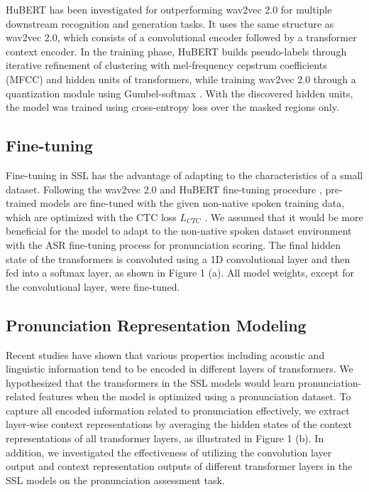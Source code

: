 \documentclass[a4paper]{article}
\begin{document}
HuBERT \cite{hsu2021hubert} has been investigated for outperforming wav2vec 2.0 for multiple downstream recognition and generation tasks. It uses the same structure as wav2vec 2.0, which consists of a convolutional encoder followed by a transformer context encoder. In the training phase, HuBERT builds pseudo-labels through iterative refinement of clustering with mel-frequency cepstrum coefficients (MFCC) and hidden units of transformers, while training wav2vec 2.0 through a quantization module using Gumbel-softmax \cite{baevski2020wav2vec}. With the discovered hidden units, the model was trained using cross-entropy loss over the masked regions only.



\subsection{Fine-tuning}
Fine-tuning in SSL has the advantage of adapting to the characteristics of a small dataset. Following the wav2vec 2.0 and HuBERT fine-tuning procedure \cite{baevski2020wav2vec,hsu2021hubert}, pre-trained models are fine-tuned with the given non-native spoken training data, which are optimized with the CTC loss $L_{CTC}$ \cite{graves2006connectionist}. We assumed that it would be more beneficial for the model to adapt to the non-native spoken dataset environment with the ASR fine-tuning process for pronunciation scoring. The final hidden state of the transformers is convoluted using a 1D convolutional layer and then fed into a softmax layer, as shown in Figure 1 (a). All model weights, except for the convolutional layer, were fine-tuned.

\subsection{Pronunciation Representation Modeling}

Recent studies \cite{pasad2021layer, shah2021all} have shown that various properties including acoustic and linguistic information tend to be encoded in different layers of transformers. We hypothesized that the transformers in the SSL models would learn pronunciation-related features when the model is optimized using a pronunciation dataset. To capture all encoded information related to pronunciation effectively, we extract layer-wise context representations by averaging the hidden states of the context representations of all transformer layers, as illustrated in Figure 1 (b). In addition, we investigated the effectiveness of utilizing the convolution layer output and context representation outputs of different transformer layers in the SSL models on the pronunciation assessment task.
\end{document}
